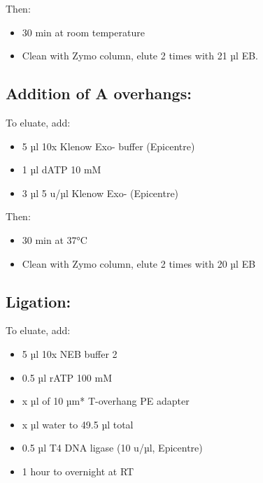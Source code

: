 \documentclass[
  letterpaper,
  DIV=11,
  numbers=noendperiod]{scrreprt}
\providecommand{\tightlist}{%
  \setlength{\itemsep}{0pt}\setlength{\parskip}{0pt}}\usepackage{longtable,booktabs,array}
\begin{document}
Then:

\begin{itemize}
\tightlist
\item
  30 min at room temperature
\item
  Clean with Zymo column, elute 2 times with 21 µl EB.
\end{itemize}

\hypertarget{addition-of-a-overhangs}{%
\subsection{Addition of A overhangs:}\label{addition-of-a-overhangs}}

To eluate, add:

\begin{itemize}
\tightlist
\item
  5 µl 10x Klenow Exo- buffer (Epicentre)
\item
  1 µl dATP 10 mM
\item
  3 µl 5 u/µl Klenow Exo- (Epicentre)
\end{itemize}

Then:

\begin{itemize}
\tightlist
\item
  30 min at 37°C
\item
  Clean with Zymo column, elute 2 times with 20 µl EB
\end{itemize}

\hypertarget{ligation}{%
\subsection{Ligation:}\label{ligation}}

To eluate, add:

\begin{itemize}
\tightlist
\item
  5 µl 10x NEB buffer 2
\item
  0.5 µl rATP 100 mM
\item
  x µl of 10 µm* T-overhang PE adapter
\item
  x µl water to 49.5 µl total
\item
  0.5 µl T4 DNA ligase (10 u/µl, Epicentre)
\item
  1 hour to overnight at RT
\end{itemize}
\end{document}
